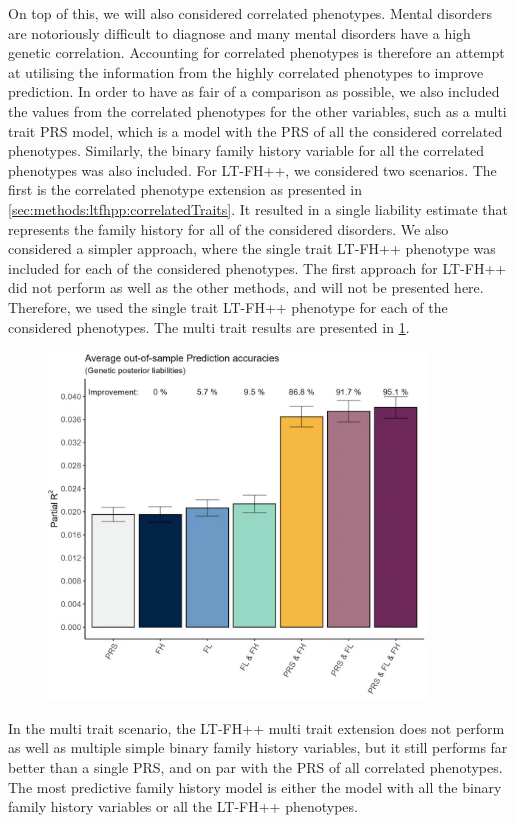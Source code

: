 On top of this, we will also considered correlated phenotypes. Mental disorders are notoriously difficult to diagnose and many mental 
disorders have a high genetic correlation. Accounting for correlated phenotypes is therefore an attempt at utilising the information 
from the highly correlated phenotypes to improve prediction. In order to have as fair of a comparison as possible, we also included 
the values from the correlated phenotypes for the other variables, such as a multi trait PRS model, which is a model with the PRS of 
all the considered correlated phenotypes. Similarly, the binary family history variable for all the correlated phenotypes was also 
included. For LT-FH++, we considered two scenarios. The first is the correlated phenotype extension as presented in 
\cref{sec:methods:ltfhpp:correlatedTraits}. It resulted in a single liability estimate that represents the family history for all of 
the considered disorders. We also considered a simpler approach, where the single trait LT-FH++ phenotype was included for each of the 
considered phenotypes. The first approach for LT-FH++ did not perform as well as the other methods, and will not be presented here. 
Therefore, we used the single trait LT-FH++ phenotype for each of the considered phenotypes. The multi trait results are presented in 
\cref{fig:paper3:predictionResultsMultiTrait}. 


\begin{figure}
	\includegraphics[width=10cm]{results/avg_partial_prediciton_accuracies_multi_trait.png}
	\caption[Average out of sample prediction for multi trait]{}
	\label{fig:paper3:predictionResultsMultiTrait}
\end{figure}


In the multi trait scenario, the LT-FH++ multi trait extension does not perform as well as multiple simple binary family history variables, but it still performs far better than a single PRS, and on par with the PRS of all correlated phenotypes. The most predictive family history model is either the model with all the binary family history variables or all the LT-FH++ phenotypes.



